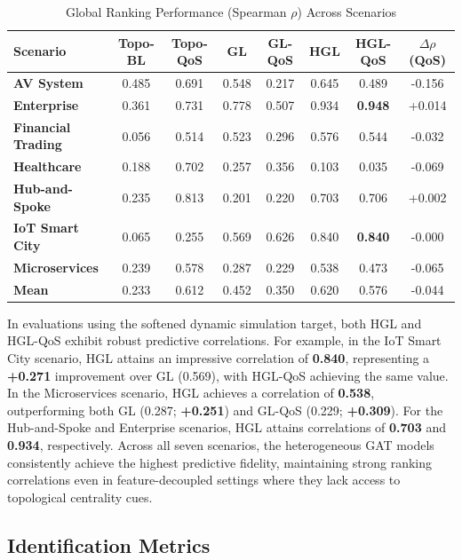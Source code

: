 \documentclass[sigconf,9pt,anonymous]{acmart}
\begin{document}
\begin{table}[t]
\centering
\caption{Global Ranking Performance (Spearman $\rho$) Across Scenarios}
\label{tab:ranking_perf}
\begin{tabular}{l c c c c c c c}
\toprule
\textbf{Scenario} & \textbf{Topo-BL} & \textbf{Topo-QoS} & \textbf{GL} & \textbf{GL-QoS} & \textbf{HGL} & \textbf{HGL-QoS} & \textbf{$\Delta\rho$ (QoS)} \\
\midrule
\textbf{AV System} & 0.485 & 0.691 & 0.548 & 0.217 & 0.645 & 0.489 & -0.156 \\
\textbf{Enterprise} & 0.361 & 0.731 & 0.778 & 0.507 & 0.934 & \textbf{0.948} & +0.014 \\
\textbf{Financial Trading} & 0.056 & 0.514 & 0.523 & 0.296 & 0.576 & 0.544 & -0.032 \\
\textbf{Healthcare} & 0.188 & 0.702 & 0.257 & 0.356 & 0.103 & 0.035 & -0.069 \\
\textbf{Hub-and-Spoke} & 0.235 & 0.813 & 0.201 & 0.220 & 0.703 & 0.706 & +0.002 \\
\textbf{IoT Smart City} & 0.065 & 0.255 & 0.569 & 0.626 & 0.840 & \textbf{0.840} & -0.000 \\
\textbf{Microservices} & 0.239 & 0.578 & 0.287 & 0.229 & 0.538 & 0.473 & -0.065 \\
\midrule
\textbf{Mean} & 0.233 & 0.612 & 0.452 & 0.350 & 0.620 & 0.576 & -0.044 \\
\bottomrule
\end{tabular}
\end{table}

In evaluations using the softened dynamic simulation target, both HGL and HGL-QoS exhibit robust predictive correlations. For example, in the IoT Smart City scenario, HGL attains an impressive correlation of \textbf{0.840}, representing a \textbf{+0.271} improvement over GL (0.569), with HGL-QoS achieving the same value. In the Microservices scenario, HGL achieves a correlation of \textbf{0.538}, outperforming both GL (0.287; \textbf{+0.251}) and GL-QoS (0.229; \textbf{+0.309}). For the Hub-and-Spoke and Enterprise scenarios, HGL attains correlations of \textbf{0.703} and \textbf{0.934}, respectively. Across all seven scenarios, the heterogeneous GAT models consistently achieve the highest predictive fidelity, maintaining strong ranking correlations even in feature-decoupled settings where they lack access to topological centrality cues.

\subsection{Identification Metrics}
\end{document}
